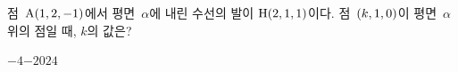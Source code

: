 점~$\mathrm{A}(1{,}\mkern3mu\mathopen{}2{,}\mkern3mu\mathopen{}-1)$에서 평면~$\alpha$에 내린 수선의 발이 $\mathrm{H}(2{,}\mkern3mu\mathopen{}1{,}\mkern3mu\mathopen{}1)$이다. 점~$(k{,}\mkern3mu\mathopen{}1{,}\mkern3mu\mathopen{}0)$이 평면~$\alpha$ 위의 점일 때, $k$의 값은?
\begin{choices32}{$-4$}{$-2$}{$0$}{$2$}{$4$}\end{choices32}
